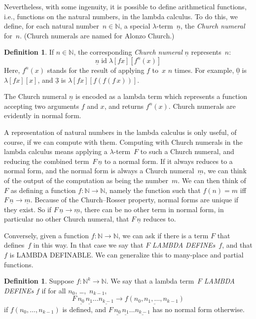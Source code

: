 \documentclass[10pt,a4paper]{article}
\newcommand*{\olup}[1]{\MakeUppercase{#1}}
\theoremstyle{plain}
\theoremstyle{definition}
\newtheorem{defn}[thm]{Definition}
\theoremstyle{remark}
\providecommand{\num}[1]{\underline{#1}}
\providecommand{\Nat}{\ensuremath{\mathbb{N}}}
\providecommand{\lambd}{\ensuremath{\lambda}}
\providecommand{\ident}{\operatorname{id}}
\providecommand{\red}{\mathrel{\rightarrow}}
\begin{document}
Nevertheless, with some ingenuity, it is possible to define
arithmetical functions, i.e., functions on the natural numbers, in the
lambda calculus. To do this, we define, for each natural number~$n \in
\Nat$, a special $\lambd$-term~$\num n$, the \emph{Church numeral}
for~$n$. (Church numerals are named for Alonzo Church.)

\begin{defn}
  If $n \in \Nat$, the corresponding \emph{Church numeral} $\num{n}$
  represents~$n$:
  \[
    \num{n} \ident \lambd[fx][f^n(x)]
  \]
  Here, $f^n(x)$ stands for the result of applying $f$ to~$x$ $n$
  times. For example, $\num{0}$ is $\lambd[fx][x]$, and $\num{3}$ is
  $\lambd[fx][f(f(f\,x))]$.
\end{defn}
  
The Church numeral $\num n$ is encoded as a lambda term which
represents a function accepting two arguments $f$ and $x$, and
returns $f^n(x)$. Church numerals are evidently in normal form.

A representation of natural numbers in the lambda calculus is only
useful, of course, if we can compute with them.  Computing with Church
numerals in the lambda calculus means applying a $\lambd$-term~$F$ to
such a Church numeral, and reducing the combined term~$F\, \num n$ to
a normal form. If it always reduces to a normal form, and the normal
form is always a Church numeral~$\num m$, we can think of the output
of the computation as being the number~$m$. We can then think of~$F$
as defining a function $f\colon \Nat \to \Nat$, namely the function
such that $f(n) = m$ iff $F\, \num n \red \num m$. Because of the
Church--Rosser property, normal forms are unique if they exist. So if
$F\, \num n \red \num m$, there can be no other term in normal form,
in particular no other Church numeral, that $F \, \num n$ reduces to.

Conversely, given a function $f\colon \Nat \to \Nat$,
we can ask if there is a term $F$ that defines~$f$ in this way. In
that case we say that $F$ \emph{\olup{lambda define}s}~$f$, and that $f$ is
\olup{lambda definable}. We can generalize this to many-place and partial
functions.

\begin{defn}
Suppose $f\colon \Nat^k \to \Nat$. We say that a lambda term~$F$
\emph{\olup{lambda define}s} $f$ if for all 
$n_0$, \dots,~$n_{k-1}$,
\[
F \, \num{n_0} \, \num{n_1} \dots \num{n_{k-1}} \red \num{f(n_0, n_1, \dots,
  n_{k-1})}
\]
if $f(n_0, \dots, n_{k-1})$ is defined, and $F \, \num{n_0} \,
\num{n_1} \dots \num{n_{k-1}}$ has no normal form otherwise.
\end{defn}
\end{document}
